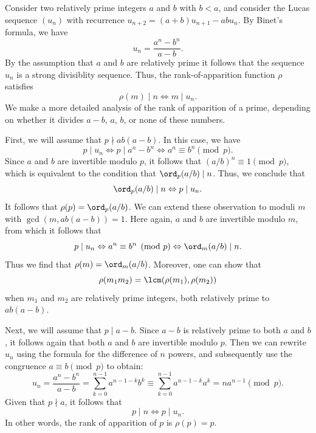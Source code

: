 \begin{example}\label{example:rank-of-apparition-square-discriminant-lucas-sequence}
  Consider two relatively prime integers $a$ and $b$ with $b<a$, and consider the Lucas sequence $(u_n)$ with recurrence $u_{n+2}=(a+b)u_{n+1}-abu_n$. By Binet's formula, we have
  \begin{equation*}
    u_n=\frac{a^n-b^n}{a-b}.
  \end{equation*}
  By the assumption that $a$ and $b$ are relatively prime it follows that the sequence $u_n$ is a strong divisiblity sequence. Thus, the rank-of-apparition function $\rho$ satisfies
  \begin{equation*}
    \rho(m)\mid n\Leftrightarrow m\mid u_n.
  \end{equation*}
  We make a more detailed analysis of the rank of apparition of a prime, depending on whether it divides $a-b$, $a$, $b$, or none of these numbers.

  First, we will assume that $p\nmid ab(a-b)$. In this case, we have
  \begin{equation*}
    p\mid u_n\Leftrightarrow p\mid a^n-b^n\Leftrightarrow a^n\equiv b^n\pmod{p}.
  \end{equation*}
  Since $a$ and $b$ are invertible modulo $p$, it follows that $(a/b)^n\equiv 1\pmod{p}$, which is equivalent to the condition that $\ord_p(a/b)\mid n$. Thus, we conclude that
  \begin{equation*}
    \ord_p(a/b)\mid n \Leftrightarrow p\mid u_n.
  \end{equation*}
  It follows that $\rho(p)=\ord_p(a/b)$. We can extend these observation to moduli $m$ with $\gcd(m,ab(a-b))=1$. Here again, $a$ and $b$ are invertible modulo $m$, from which it follows that
  \begin{equation*}
    p\mid u_n\Leftrightarrow a^n\equiv b^n\pmod{p}\Leftrightarrow \ord_m(a/b)\mid n.
  \end{equation*}
  Thus we find that $\rho(m)=\ord_m(a/b)$. Moreover, one can show that
  \begin{equation*}
    \rho(m_1m_2)=\lcm(\rho(m_1),\rho(m_2))
  \end{equation*}
  when $m_1$ and $m_2$ are relatively prime integers, both relatively prime to $ab(a-b)$.

  Next, we will assume that $p\mid a-b$. Since $a-b$ is relatively prime to both $a$ and $b$, it follows again that both $a$ and $b$ are invertible modulo $p$. Then we can rewrite $u_n$ using the formula for the difference of $n$\supth{} powers, and subsequently use the congruence $a\equiv b\pmod{p}$ to obtain:
  \begin{equation*}
    u_n=\frac{a^n-b^n}{a-b}=\sum_{k=0}^{n-1} a^{n-1-k}b^k \equiv \sum_{k=0}^{n-1} a^{n-1-k}a^k = na^{n-1}\pmod{p}.
  \end{equation*}
  Given that $p\nmid a$, it follows that
  \begin{equation*}
    p\mid n\Leftrightarrow p\mid u_n.
  \end{equation*}
  In other words, the rank of apparition of $p$ is $\rho(p)=p$.


\end{example}
